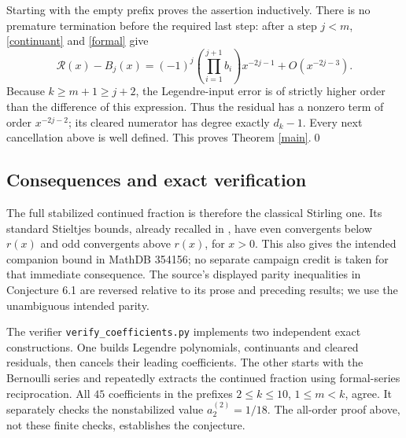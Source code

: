 \documentclass[11pt]{article}
\begin{document}
Starting with the empty prefix proves the assertion inductively.
There is no premature termination before the required last step:
after a step \(j<m\), \eqref{continuant} and \eqref{formal} give
\[
 \mathcal R(x)-B_j(x)
 =(-1)^j\!\left(\prod_{i=1}^{j+1}b_i\right)x^{-2j-1}
  +O(x^{-2j-3}).
\]
Because \(k\geq m+1\geq j+2\), the Legendre-input error is of
strictly higher order than the difference of this expression.
Thus the residual has a nonzero term of order \(x^{-2j-2}\);
its cleared numerator has degree exactly \(d_k-1\).
Every next cancellation above is well defined. This proves
Theorem \ref{main}.\qed

\subsection*{Consequences and exact verification}
The full stabilized continued fraction is therefore the classical
Stirling one. Its standard Stieltjes bounds, already recalled in
\cite[Section 6]{BR}, have even convergents below \(r(x)\) and odd
convergents above \(r(x)\), for \(x>0\).
This also gives the intended companion bound in MathDB 354156;
no separate campaign credit is taken for that immediate consequence.
The source's displayed parity inequalities in Conjecture 6.1 are
reversed relative to its prose and preceding results; we use the
unambiguous intended parity.

The verifier \texttt{verify\_coefficients.py} implements two independent
exact constructions. One builds Legendre polynomials, continuants
and cleared residuals, then cancels their leading coefficients.
The other starts with the Bernoulli series and repeatedly extracts
the continued fraction using formal-series reciprocation.
All \(45\) coefficients in the prefixes \(2\leq k\leq10\),
\(1\leq m<k\), agree. It separately checks the nonstabilized
value \(a_2^{(2)}=1/18\). The all-order proof above, not these
finite checks, establishes the conjecture.
\end{document}
